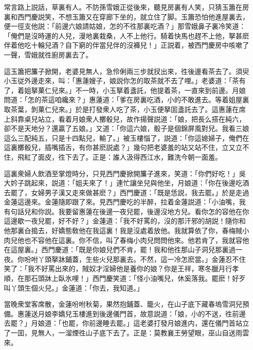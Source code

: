 常言路上説話，草裏有人。不防孫雪娥正從後來，聽見房裏有人笑，只猜玉簫在房裏和西門慶説笑，不想玉簫又在穿廊下坐的，就立住了脚。玉簫恐怕他進屋裏去，便一徑支他説：「前邊六娘請姑娘，怎的不徃那裏吃酒？」那雪娥鼻子裏冷笑道：「俺們是沒時運的人兒，漫地裏栽桑，人不上他行。騎着快馬也趕不上他，拏甚麽伴着他吃十輪兒酒？自下窮的伴當兒伴的沒褲兒！」正説着，被西門慶房中咳嗽了一聲，雪娥就徃廚房裏去了。

這玉簫把簾子掀開，老婆見無人，急伶俐兩三步就扠出來，徃後邊看茶去了。須臾小玉従外邊走來，叫：「惠蓮嫂子，娘説你怎的取茶就不去了哩。」老婆道：「茶有了，着姐拏菓仁兒來。」不一時，小玉拏着盞託，他提着茶，一直來到前邊。月娘問道：「怎的茶這咱纔來？」惠蓮道：「爹在房裏吃酒，小的不敢進去。等着姐屋裏取茶葉，剝菓仁兒來。」於是打發衆人吃了茶，小玉便拏囬盞託去了。這惠蓮在席上斜靠桌兒站立，看着月娘衆人擲骰兒，故作揚聲説道：「娘，把長么搭在純六，卻不是天地分？還贏了五娘。」又道：「你這六娘，骰子是個錦屏風對兒。我看三娘這么三配純五，只是十四點兒，輸了。」被玉樓惱了，説道：「你這媳婦子，俺們在這裏擲骰兒，插嘴插舌，有你甚麽説處？」幾句把老婆羞的站又站不住，立又立不住，飛紅了面皮，徃下去了。正是：誰人汲得西江水，難洗今朝一面羞。

這裏衆婦人飲酒至掌燈時分，只見西門慶掀開簾子進來，笑道：「你們好吃！」吳大妗子跳起來，説道：「姐夫來了！」連忙讓坐兒與他坐，月娘道：「你在後邊吃酒去罷了，女婦男子漢又走來做甚麽？」西門慶道：「既是恁説，我去罷。」於是走過金蓮這邊來。金蓮隨即跟了來。見西門慶吃的半醉，拉着金蓮説道：「小油嘴，我有句話兒和你説。我要留惠蓮在後邊一夜兒罷，後邊沒地方兒。看你怎的容他在你這邊歇一夜兒罷，好不好？」金蓮道：「我不好罵的，沒的那汗邪的胡説！隨你和他那裏㒲搗去，好嬌態敎他在我這裏！我是沒處着放他。我就算依了你，春梅賊小肉兒他也不容他在這裏。你不信，叫了春梅小肉兒問問他來。他若肯了，我就容他在這屋裏。」西門慶道：「既是你娘兒們不肯，罷！我和他徃那山子洞兒那裏過一夜。你吩咐丫頭拏牀鋪蓋，生些火兒那裏去。不然，這一冷怎麽當。」金蓮忍不住笑了：「我不好罵出來的，賊奴才淫婦他是養你的娘？你是王祥，寒冬臘月行孝順，在那石頭牀上臥氷哩！」西門慶笑道：「怪小油嘴兒，休奚落我。罷麽！好歹叫丫頭生個火兒。」金蓮道：「你去，我知道。」

當晚衆堂客席散，金蓮吩咐秋菊，果然抱鋪蓋、籠火，在山子底下藏春塢雪洞兒預備。惠蓮送月娘李嬌兒玉樓進到後邊儀門首，故意説道：「娘，小的不送，徃前邊去罷？」月娘道：「也罷，你前邊睡去罷。」這老婆打發月娘進内，還在儀門首站立了一囬，見無人，一溜煙徃山子底下去了。正是：莫教襄王勞望眼，巫山自送雨雲來。

